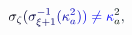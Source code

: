 \documentclass[12pt]{article}
\begin{document}
\makeatletter
\renewcommand*{\@textcolor}[3]{%
  \protect\leavevmode
  \begingroup
    \color#1{#2}#3%
  \endgroup
}
\makeatother
\begin{displaymath}
\mathcolor[RGB]{0,0,15}{\sigma} _ { \mathcolor[RGB]{0,0,30}{\zeta} } \mathcolor[RGB]{0,0,45}{(} \mathcolor[RGB]{0,0,60}{\sigma} _ { \mathcolor[RGB]{0,0,75}{\xi} \mathcolor[RGB]{0,0,90}{+} \mathcolor[RGB]{0,0,105}{1} } ^ { \mathcolor[RGB]{0,0,120}{-} \mathcolor[RGB]{0,0,135}{1} } \mathcolor[RGB]{0,0,150}{(} \mathcolor[RGB]{0,0,165}{\kappa} _ { \mathcolor[RGB]{0,0,180}{a} } ^ { \mathcolor[RGB]{0,0,195}{2} } \mathcolor[RGB]{0,0,210}{)} \mathcolor[RGB]{0,0,225}{)} \mathcolor[RGB]{0,0,240}{\neq} \mathcolor[RGB]{0,0,255}{\kappa} _ { \mathcolor[RGB]{0,15,0}{a} } ^ { \mathcolor[RGB]{0,15,15}{2} } \mathcolor[RGB]{0,15,30}{,}
\end{displaymath}
\end{document}

